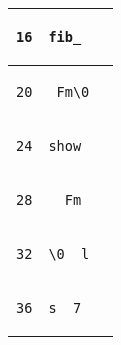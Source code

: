 \documentclass{ti2}
\begin{document}
\begin{tabular}{ | l | l | l|}
\begin{lstlisting}
16
\end{lstlisting} &
\begin{lstlisting}
fib_
\end{lstlisting} &
\begin{lstlisting}
\end{lstlisting} \\ \hline

\begin{lstlisting}
20
\end{lstlisting} &
\begin{lstlisting}
_Fm\0
\end{lstlisting} &
\begin{lstlisting}
\end{lstlisting} \\ \hline

\begin{lstlisting}
24
\end{lstlisting} &
\begin{lstlisting}
show
\end{lstlisting} &
\begin{lstlisting}
\end{lstlisting} \\ \hline

\begin{lstlisting}
28
\end{lstlisting} &
\begin{lstlisting}
__Fm
\end{lstlisting} &
\begin{lstlisting}
\end{lstlisting} \\ \hline

\begin{lstlisting}
32
\end{lstlisting} &
\begin{lstlisting}
\0__l
\end{lstlisting} &
\begin{lstlisting}
\end{lstlisting} \\ \hline

\begin{lstlisting}
36
\end{lstlisting} &
\begin{lstlisting}
s__7
\end{lstlisting} &
\begin{lstlisting}
\end{lstlisting} \\ \hline


\end{tabular}
\end{document}
